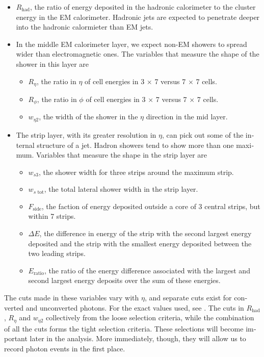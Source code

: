 \begin{english}
\begin{itemize}
\item $R_\text{had}$, the ratio of energy deposited in the hadronic calorimeter to the cluster energy in the EM calorimeter. Hadronic jets are expected to penetrate deeper into the hadronic calormieter than EM jets.
\item In the middle EM calorimeter layer, we expect non-EM showers to spread wider than electromagnetic ones. The variables that measure the shape of the shower in this layer are
\begin{itemize}
\item $R_\eta$, the ratio in $\eta$ of cell energies in 3 $\times$ 7 versus 7 $\times$ 7 cells.
\item $R_\phi$, the ratio in $\phi$ of cell energies in 3 $\times$ 7 versus 7 $\times$ 7 cells.
\item $w_{\eta 2}$, the width of the shower in the $\eta$ direction in the mid layer.
\end{itemize}
\item The strip layer, with its greater resolution in $\eta$, can pick out some of the internal structure of a jet. Hadron showers tend to show more than one maximum. Variables that measure the shape in the strip layer are
\begin{itemize}
\item $w_{s3}$, the shower width for three strips around the maximum strip.
\item $w_{s\text{ tot}}$, the total lateral shower width in the strip layer.
\item $F_\text{side}$, the faction of energy deposited outside a core of 3 central strips, but within 7 strips.
\item $\Delta E$, the difference in energy of the strip with the second largest energy deposited and the strip with the smallest energy deposited between the two leading strips.
\item $E_\text{ratio}$, the ratio of the energy difference associated with the
largest and second largest energy deposits over the
sum of these energies.
\end{itemize}
\end{itemize}

The cuts made in these variables vary with $\eta$, and separate cuts exist for converted and unconverted photons. For the exact values used, see \cite{Carminati}. The cuts in $R_\text{had}$, $R_\eta$ and $w_{\eta2}$ collectively from the loose selection criteria, while the combination of all the cuts forms the tight selection criteria. These selections will become important later in the analysis. More immediately, though, they will allow us to record photon events in the first place.


\end{english}
